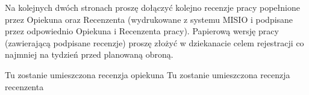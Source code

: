 {\newpage

\noindent
Na kolejnych dwóch stronach proszę dołączyć 
kolejno recenzje pracy popełnione przez Opiekuna oraz Recenzenta 
(wydrukowane z systemu MISIO i podpisane 
przez odpowiednio Opiekuna i Recenzenta pracy). 
Papierową wersję pracy (zawierającą 
podpisane recenzje) proszę złożyć
 w dziekanacie celem rejestracji co najmniej 
na tydzień przed planowaną obroną.

\newpage
Tu zostanie umieszczona recenzja opiekuna
\newpage
Tu zostanie umieszczona recenzja recenzenta
\newpage
}
\linespread{1.3}
\selectfont

